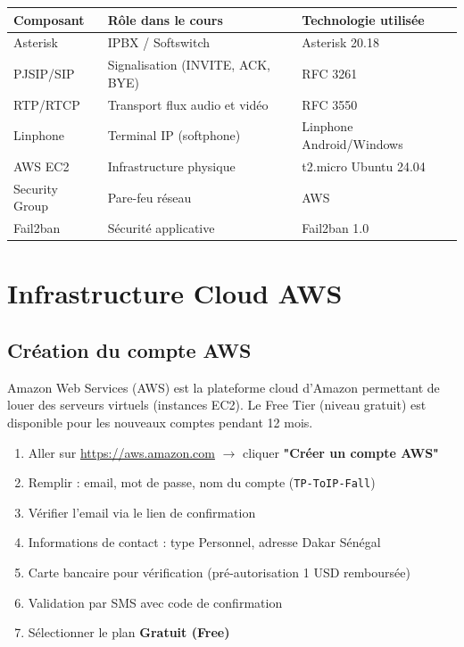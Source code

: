 \documentclass[a4paper,11pt]{report}
\begin{document}
\begin{center}
\begin{tabular}{lll}
\toprule
\rowcolor{primarylight}\textbf{Composant} & \textbf{Rôle dans le cours} & \textbf{Technologie utilisée}\\
\midrule
Asterisk & IPBX / Softswitch & Asterisk 20.18\\
PJSIP/SIP & Signalisation (INVITE, ACK, BYE) & RFC 3261\\
RTP/RTCP & Transport flux audio et vidéo & RFC 3550\\
Linphone & Terminal IP (softphone) & Linphone Android/Windows\\
AWS EC2 & Infrastructure physique & t2.micro Ubuntu 24.04\\
Security Group & Pare-feu réseau & AWS\\
Fail2ban & Sécurité applicative & Fail2ban 1.0\\
\bottomrule
\end{tabular}
\end{center}

\chapter{Infrastructure Cloud AWS}

\section{Création du compte AWS}

Amazon Web Services (AWS) est la plateforme cloud d'Amazon permettant de louer des serveurs virtuels (instances EC2). Le Free Tier (niveau gratuit) est disponible pour les nouveaux comptes pendant 12 mois.

\begin{infobox}
\begin{enumerate}[leftmargin=1.4em, itemsep=3pt]
  \item Aller sur \url{https://aws.amazon.com} $\to$ cliquer \textbf{"Créer un compte AWS"}
  \item Remplir : email, mot de passe, nom du compte (\texttt{TP-ToIP-Fall})
  \item Vérifier l'email via le lien de confirmation
  \item Informations de contact : type Personnel, adresse Dakar Sénégal
  \item Carte bancaire pour vérification (pré-autorisation 1 USD remboursée)
  \item Validation par SMS avec code de confirmation
  \item Sélectionner le plan \textbf{Gratuit (Free)}
\end{enumerate}
\end{infobox}
\end{document}
